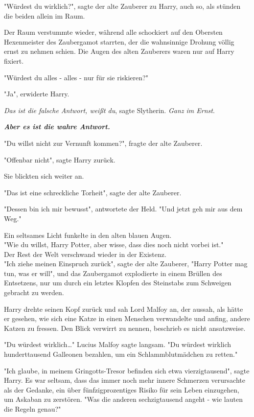 {"Würdest du wirklich?", sagte der alte Zauberer zu Harry, auch so, als stünden die beiden allein im Raum.

Der Raum verstummte wieder, während alle schockiert auf den Obersten Hexenmeister des Zaubergamot starrten, der die wahnsinnige Drohung völlig ernst zu nehmen schien. Die Augen des alten Zauberers waren nur auf Harry fixiert.

"Würdest du alles - alles - nur für sie riskieren?"

"Ja", erwiderte Harry.

\emph{Das ist die falsche Antwort, weißt du}, sagte Slytherin. \emph{Ganz im Ernst}.

\textbf{\emph{Aber es ist die wahre Antwort.}}

"Du willst nicht zur Vernunft kommen?", fragte der alte Zauberer.

"Offenbar nicht", sagte Harry zurück.

Sie blickten sich weiter an.

"Das ist eine schreckliche Torheit", sagte der alte Zauberer.

"Dessen bin ich mir bewusst", antwortete der Held. "Und jetzt geh mir aus dem Weg."

Ein seltsames Licht funkelte in den alten blauen Augen.\\ "Wie du willst, Harry Potter, aber wisse, dass dies noch nicht vorbei ist."\\ Der Rest der Welt verschwand wieder in der Existenz.\\ "Ich ziehe meinen Einspruch zurück", sagte der alte Zauberer, "Harry Potter mag tun, was er will", und das Zaubergamot explodierte in einem Brüllen des Entsetzens, nur um durch ein letztes Klopfen des Steinstabs zum Schweigen gebracht zu werden.

Harry drehte seinen Kopf zurück und sah Lord Malfoy an, der aussah, als hätte er gesehen, wie sich eine Katze in einen Menschen verwandelte und anfing, andere Katzen zu fressen. Den Blick verwirrt zu nennen, beschrieb es nicht ansatzweise.

"Du würdest wirklich…" Lucius Malfoy sagte langsam. "Du würdest wirklich hunderttausend Galleonen bezahlen, um ein Schlammblutmädchen zu retten."

"Ich glaube, in meinem Gringotts-Tresor befinden sich etwa vierzigtausend", sagte Harry. Es war seltsam, dass das immer noch mehr innere Schmerzen verursachte als der Gedanke, ein über fünfzigprozentiges Risiko für sein Leben einzugehen, um Askaban zu zerstören. "Was die anderen sechzigtausend angeht - wie lauten die Regeln genau?"

}
